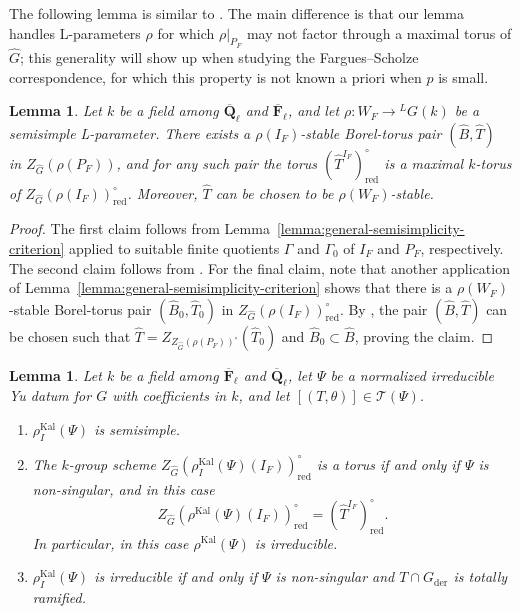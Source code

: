 \documentclass[reqno]{amsart}
\numberwithin{equation}{subsection}
\newcommand{\F}{\mathbf{F}}
\newcommand{\Q}{\mathbf{Q}}
\newcommand{\ol}[1]{\overline{#1}}
\newcommand{\wh}[1]{\widehat{#1}}
\newcommand{\co}{\colon}
\newcommand{\ld}{{}^L}
\newcommand\cT{\mathcal{T}}
\DeclareMathOperator{\red}{red}
\DeclareMathOperator{\Kal}{Kal}
\DeclareMathOperator{\der}{der}
\newtheorem{lemma}[thm]{Lemma}
\theoremstyle{remark}
\numberwithin{equation}{subsection}
\numberwithin{figure}{subsection}
\begin{document}
The following lemma is similar to \cite[Lemma 4.1.3]{Kal21b}. The main difference is that our lemma handles L-parameters $\rho$ for which $\rho|_{P_F}$ may not factor through a maximal torus of $\wh G$; this generality will show up when studying the Fargues--Scholze correspondence, for which this property is not known a priori when $p$ is small.

\begin{lemma}\label{lemma:toral-l-parameter-variant}
Let $k$ be a field among $\ol\Q_\ell$ and $\ol\F_\ell$, and let $\rho\co W_F \to \ld G(k)$ be a semisimple L-parameter. There exists a $\rho(I_F)$-stable Borel-torus pair $(\wh B, \wh T)$ in $Z_{\wh G}(\rho(P_F))$, and for any such pair the torus $(\wh T^{I_F})^\circ_{\red}$ is a maximal $k$-torus of $Z_{\wh G}(\rho(I_F))^\circ_{\red}$. Moreover, $\wh T$ can be chosen to be $\rho(W_F)$-stable.
\end{lemma}

\begin{proof}
The first claim follows from Lemma~\ref{lemma:general-semisimplicity-criterion} applied to suitable finite quotients $\Gamma$ and $\Gamma_0$ of $I_F$ and $P_F$, respectively. The second claim follows from \cite[Th\'eor\`eme 1.8(iii)]{DM94}. For the final claim, note that another application of Lemma~\ref{lemma:general-semisimplicity-criterion} shows that there is a $\rho(W_F)$-stable Borel-torus pair $(\wh B_0, \wh T_0)$ in $Z_{\wh G}(\rho(I_F))^\circ_{\red}$. By \cite[Th\'eor\`eme 1.8(iv)]{DM94}, the pair $(\wh B, \wh T)$ can be chosen such that $\wh T = Z_{Z_{\wh G}(\rho(P_F))^\circ}(\wh T_0)$ and $\wh B_0 \subset \wh B$, proving the claim.
\end{proof}

\begin{lemma}\label{lemma:non-singular-irreducible}
Let $k$ be a field among $\ol\F_\ell$ and $\ol\Q_\ell$, let $\Psi$ be a normalized irreducible Yu datum for $G$ with coefficients in $k$, and let $[(T,\theta)] \in \cT(\Psi)$.
\begin{enumerate}
    \item $\rho_I^{\Kal}(\Psi)$ is semisimple.
    \item The $k$-group scheme $Z_{\wh G}(\rho_I^{\Kal}(\Psi)(I_F))^\circ_{\red}$ is a torus if and only if $\Psi$ is non-singular, and in this case
    \begin{equation}\label{eqn:inertial-fixed-points-torus}
    Z_{\wh G}(\rho^{\Kal}(\Psi)(I_F))^\circ_{\red} = (\wh T^{I_F})^\circ_{\red}.
    \end{equation}
    In particular, in this case $\rho^{\Kal}(\Psi)$ is irreducible.
    \item $\rho_I^{\Kal}(\Psi)$ is irreducible if and only if $\Psi$ is non-singular and $T \cap G_{\der}$ is totally ramified.
\end{enumerate}
\end{lemma}
\end{document}
